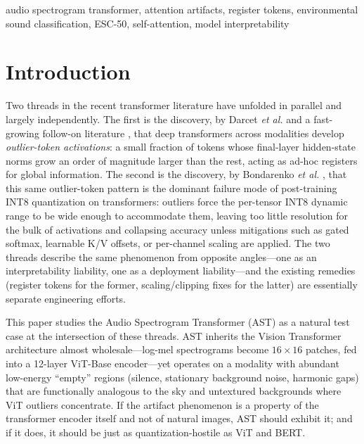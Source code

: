 \documentclass[conference]{IEEEtran}
\begin{document}
\begin{IEEEkeywords}
audio spectrogram transformer, attention artifacts, register tokens, environmental sound classification, ESC-50, self-attention, model interpretability
\end{IEEEkeywords}

\section{Introduction}

Two threads in the recent transformer literature have unfolded in parallel and largely independently. The first is the discovery, by Darcet \emph{et al.} \cite{darcet2024need} and a fast-growing follow-on literature \cite{wang2024mambar,sun2024massive,gu2025emergence,barbero2025firsttoken}, that deep transformers across modalities develop \emph{outlier-token activations}: a small fraction of tokens whose final-layer hidden-state norms grow an order of magnitude larger than the rest, acting as ad-hoc registers for global information. The second is the discovery, by Bondarenko \emph{et al.} \cite{bondarenko2023quantizable}, that this same outlier-token pattern is the dominant failure mode of post-training INT8 quantization on transformers: outliers force the per-tensor INT8 dynamic range to be wide enough to accommodate them, leaving too little resolution for the bulk of activations and collapsing accuracy unless mitigations such as gated softmax, learnable K/V offsets, or per-channel scaling are applied. The two threads describe the same phenomenon from opposite angles---one as an interpretability liability, one as a deployment liability---and the existing remedies (register tokens for the former, scaling/clipping fixes for the latter) are essentially separate engineering efforts.

This paper studies the Audio Spectrogram Transformer (AST) \cite{gong2021ast} as a natural test case at the intersection of these threads. AST inherits the Vision Transformer architecture \cite{dosovitskiy2021image,vaswani2017attention} almost wholesale---log-mel spectrograms become $16\times 16$ patches, fed into a 12-layer ViT-Base encoder---yet operates on a modality with abundant low-energy ``empty'' regions (silence, stationary background noise, harmonic gaps) that are functionally analogous to the sky and untextured backgrounds where ViT outliers concentrate. If the artifact phenomenon is a property of the transformer encoder itself and not of natural images, AST should exhibit it; and if it does, it should be just as quantization-hostile as ViT and BERT.
\end{document}
